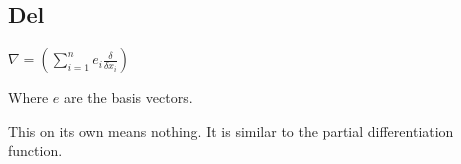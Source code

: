 
\subsection{Del}

\(\nabla =(\sum_{i=1}^n e_i\frac{\delta }{\delta x_i})\)

Where \(e\) are the basis vectors.

This on its own means nothing. It is similar to the partial differentiation function.

